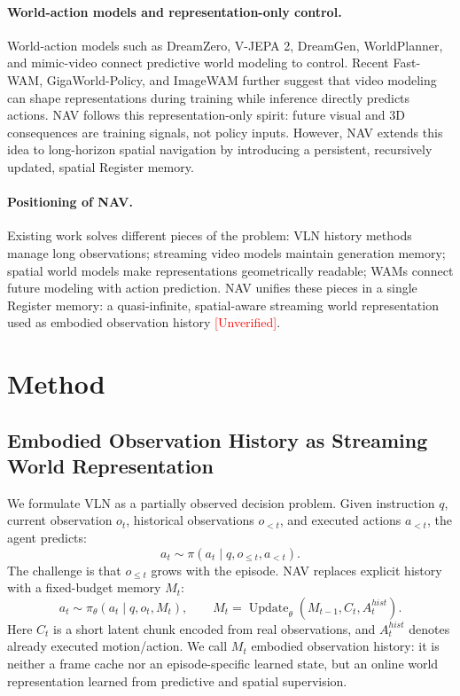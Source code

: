 \documentclass[11pt,a4paper]{ctexart}
\newcommand{\method}{NAV}
\newcommand{\unverified}{\textcolor{red}{[Unverified]}}
\begin{document}
\paragraph{World-action models and representation-only control.}
World-action models such as DreamZero, V-JEPA 2, DreamGen, WorldPlanner, and mimic-video connect predictive world modeling to control. Recent Fast-WAM, GigaWorld-Policy, and ImageWAM further suggest that video modeling can shape representations during training while inference directly predicts actions. \method{} follows this representation-only spirit: future visual and 3D consequences are training signals, not policy inputs. However, \method{} extends this idea to long-horizon spatial navigation by introducing a persistent, recursively updated, spatial Register memory.

\paragraph{Positioning of NAV.}
Existing work solves different pieces of the problem: VLN history methods manage long observations; streaming video models maintain generation memory; spatial world models make representations geometrically readable; WAMs connect future modeling with action prediction. \method{} unifies these pieces in a single Register memory: a quasi-infinite, spatial-aware streaming world representation used as embodied observation history \unverified{}.

\section{Method}

\subsection{Embodied Observation History as Streaming World Representation}

We formulate VLN as a partially observed decision problem. Given instruction \(q\), current observation \(o_t\), historical observations \(o_{<t}\), and executed actions \(a_{<t}\), the agent predicts:
\[
a_t \sim \pi(a_t \mid q, o_{\leq t}, a_{<t}).
\]
The challenge is that \(o_{\leq t}\) grows with the episode. \method{} replaces explicit history with a fixed-budget memory \(M_t\):
\[
a_t \sim \pi_\theta(a_t \mid q, o_t, M_t),
\qquad
M_t = \operatorname{Update}_\theta(M_{t-1}, C_t, A^{hist}_t).
\]
Here \(C_t\) is a short latent chunk encoded from real observations, and \(A^{hist}_t\) denotes already executed motion/action. We call \(M_t\) embodied observation history: it is neither a frame cache nor an episode-specific learned state, but an online world representation learned from predictive and spatial supervision.
\end{document}

